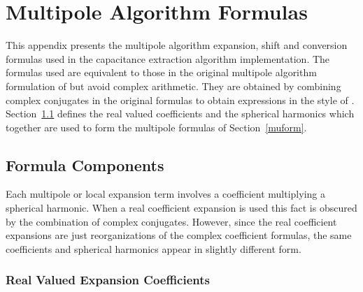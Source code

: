%

%
%

\section{Multipole Algorithm Formulas}
\label{appfor}

This appendix presents the multipole algorithm expansion, shift
and conversion formulas used in the capacitance extraction algorithm
implementation.
The formulas used are equivalent to those
in the original multipole algorithm formulation
of \cite{gre,fft} but avoid complex arithmetic.
They are obtained by combining complex conjugates in
the original formulas to obtain expressions in the style of \cite{hob}. 
Section~\ref{mopart} defines the real valued
coefficients and the spherical harmonics which together are used to form
the multipole formulas of Section~\ref{muform}.

\subsection{Formula Components}
\label{mopart}

Each multipole or local expansion term involves a 
coefficient multiplying a spherical harmonic. 
When a real coefficient expansion is
used this fact is obscured by the combination of complex conjugates.
However, since the real coefficient expansions are just reorganizations of 
the complex coefficient formulas, the
same coefficients and spherical harmonics appear in slightly different form.

\subsubsection{Real Valued Expansion Coefficients}

